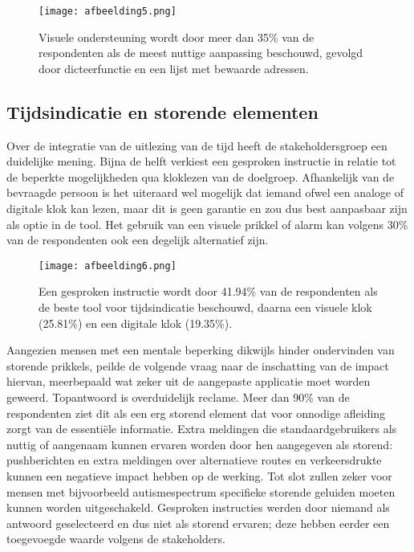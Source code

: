 \begin{figure}[h]
    \centering
    \texttt{[image: afbeelding5.png]}
    \caption{Visuele ondersteuning wordt door meer dan 35\% van de respondenten als de meest nuttige aanpassing beschouwd, gevolgd door dicteerfunctie en een lijst met bewaarde adressen.}
    \label{fig:belang}
\end{figure}

\subsection*{Tijdsindicatie en storende elementen}
Over de integratie van de uitlezing van de tijd heeft de stakeholdersgroep een duidelijke mening. Bijna de helft verkiest een gesproken instructie in relatie tot de beperkte mogelijkheden qua kloklezen van de doelgroep. Afhankelijk van de bevraagde persoon is het uiteraard wel mogelijk dat iemand ofwel een analoge of digitale klok kan lezen, maar dit is geen garantie en zou dus best aanpasbaar zijn als optie in de tool. Het gebruik van een visuele prikkel of alarm kan volgens 30\% van de respondenten ook een degelijk alternatief zijn.

\begin{figure}[h]
    \centering
    \texttt{[image: afbeelding6.png]}
    \caption{Een gesproken instructie wordt door 41.94\% van de respondenten als de beste tool voor tijdsindicatie beschouwd, daarna een visuele klok (25.81\%) en een digitale klok (19.35\%).}
    \label{fig:selectietijd}
\end{figure}

Aangezien mensen met een mentale beperking dikwijls hinder ondervinden van storende prikkels, peilde de volgende vraag naar de inschatting van de impact hiervan, meerbepaald wat zeker uit de aangepaste applicatie moet worden geweerd. Topantwoord is overduidelijk reclame. Meer dan 90\% van de respondenten ziet dit als een erg storend element dat voor onnodige afleiding zorgt van de essentiële informatie. Extra meldingen die standaardgebruikers als nuttig of aangenaam kunnen ervaren worden door hen aangegeven als storend: pushberichten en extra meldingen over alternatieve routes en verkeersdrukte kunnen een negatieve impact hebben op de werking. Tot slot zullen zeker voor mensen met bijvoorbeeld autismespectrum specifieke storende geluiden moeten kunnen worden uitgeschakeld. Gesproken instructies werden door niemand als antwoord geselecteerd en dus niet als storend ervaren; deze hebben eerder een toegevoegde waarde volgens de stakeholders.

